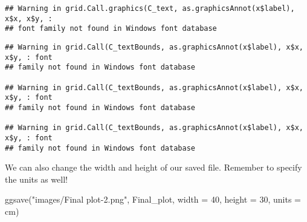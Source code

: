 \documentclass[
]{book}
\newenvironment{Shaded}{\begin{snugshade}}{\end{snugshade}}
\newcommand{\AttributeTok}[1]{\textcolor[rgb]{0.77,0.63,0.00}{#1}}
\newcommand{\DecValTok}[1]{\textcolor[rgb]{0.00,0.00,0.81}{#1}}
\newcommand{\FunctionTok}[1]{\textcolor[rgb]{0.00,0.00,0.00}{#1}}
\newcommand{\NormalTok}[1]{#1}
\newcommand{\StringTok}[1]{\textcolor[rgb]{0.31,0.60,0.02}{#1}}
\begin{document}
\begin{verbatim}
## Warning in grid.Call.graphics(C_text, as.graphicsAnnot(x$label), x$x, x$y, :
## font family not found in Windows font database
\end{verbatim}

\begin{verbatim}
## Warning in grid.Call(C_textBounds, as.graphicsAnnot(x$label), x$x, x$y, : font
## family not found in Windows font database

## Warning in grid.Call(C_textBounds, as.graphicsAnnot(x$label), x$x, x$y, : font
## family not found in Windows font database

## Warning in grid.Call(C_textBounds, as.graphicsAnnot(x$label), x$x, x$y, : font
## family not found in Windows font database
\end{verbatim}

We can also change the width and height of our saved file. Remember to specify the units as well!

\begin{Shaded}
\begin{Highlighting}[]
\FunctionTok{ggsave}\NormalTok{(}\StringTok{"images/Final plot{-}2.png"}\NormalTok{, Final\_plot, }\AttributeTok{width =} \DecValTok{40}\NormalTok{, }\AttributeTok{height =} \DecValTok{30}\NormalTok{, }\AttributeTok{units =} \StringTok{\textquotesingle{}cm\textquotesingle{}}\NormalTok{)}
\end{Highlighting}
\end{Shaded}
\end{document}
